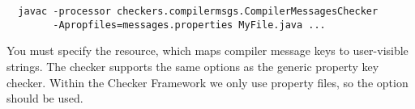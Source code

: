 \begin{Verbatim}
  javac -processor checkers.compilermsgs.CompilerMessagesChecker
        -Apropfiles=messages.properties MyFile.java ...
\end{Verbatim}

You must specify the resource, which maps compiler message keys to user-visible
strings.  The checker supports the same options as the generic property key checker.
Within the Checker Framework we only use property files,
so the  option should be used.

